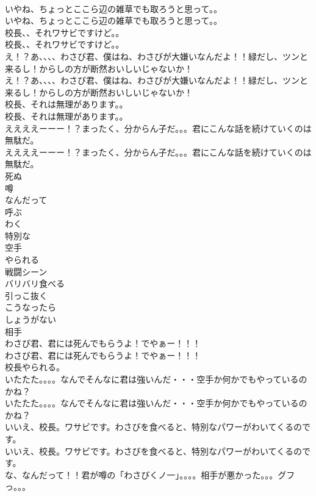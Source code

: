 \documentclass[8pt]{extreport}
\begin{document}
\begin{CJK}{UTF8}{min}
\\	いやね、ちょっとここら辺の雑草でも取ろうと思って。。	
\\	いやね、ちょっとここら辺の雑草でも取ろうと思って。。 
\\	校長、、それワサビですけど。。	
\\	校長、、それワサビですけど。。 
\\	え！？あ、、、、わさび君、僕はね、わさびが大嫌いなんだよ！！緑だし、ツンと来るし！からしの方が断然おいしいじゃないか！	
\\	え！？あ、、、、わさび君、僕はね、わさびが大嫌いなんだよ！！緑だし、ツンと来るし！からしの方が断然おいしいじゃないか！ 
\\	校長、それは無理があります。。	
\\	校長、それは無理があります。。 
\\	ええええーーー！？まったく、分からん子だ。。。君にこんな話を続けていくのは無駄だ。	
\\	ええええーーー！？まったく、分からん子だ。。。君にこんな話を続けていくのは無駄だ。 
\\	死ぬ
\\	噂
\\	なんだって
\\	呼ぶ
\\	わく
\\	特別な
\\	空手
\\	やられる
\\	戦闘シーン
\\	バリバリ食べる
\\	引っこ抜く
\\	こうなったら
\\	しょうがない
\\	相手
\\	わさび君、君には死んでもらうよ！でやぁー！！！	
\\	わさび君、君には死んでもらうよ！でやぁー！！！ 
\\	校長やられる。	
\\	いたたた。。。。なんでそんなに君は強いんだ・・・空手か何かでもやっているのかね？	
\\	いたたた。。。。なんでそんなに君は強いんだ・・・空手か何かでもやっているのかね？ 
\\	いいえ、校長。ワサビです。わさびを食べると、特別なパワーがわいてくるのです。	
\\	いいえ、校長。ワサビです。わさびを食べると、特別なパワーがわいてくるのです。 
\\	な、なんだって！！君が噂の「わさびくノ一」。。。。相手が悪かった。。。グフっ。。。	

\end{CJK}
\end{document}
